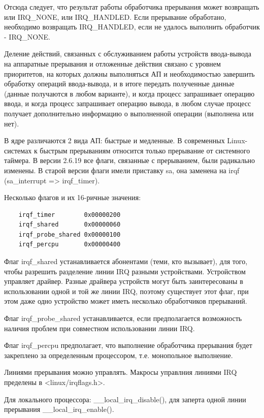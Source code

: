 \documentclass[12pt,a4paper]{scrreprt}
\begin{document}
Отсюда следует, что результат работы обработчика прерывания может возвращать или IRQ\_NONE, или IRQ\_HANDLED. Если прерывание обработано, необходимо возвращать IRQ\_HANDLED, если не удалось выполнить обработчик - IRQ\_NONE.

Деление действий, связанных с обслуживанием работы устройств ввода-вывода на аппаратные прерывания и отложенные действия связано с уровнем приоритетов, на которых должны выполняться
АП и необходимостью завершить обработку операций ввода-вывода, и в итоге передать полученные
данные (данные получаются в любом варианте), и когда процесс запрашивает операцию ввода, и когда
процесс запрашивает операцию вывода, в любом случае процесс получает дополнительно информацию о выполненной операции (выполнена или нет).

В ядре различаются 2 вида АП: быстрые и медленные. В современных Linux-системах к быстрым прерываниям относится только прерывание от системного таймера. В версии 2.6.19 все флаги, связанные с прерыванием, были радикально изменены. В старой версии флаги имели приставку sa, она заменена на irqf (sa\_interrupt => irqf\_timer).

Несколько флагов и их 16-ричные значения:

\begin{lstlisting}
	irqf_timer        0x00000200
	irqf_shared       0x00000060
	irqf_probe_shared 0x00000100
	irqf_percpu       0x00000400
\end{lstlisting}

Флаг irqf\_shared устанавливается абонентами (теми, кто вызывает), для того, чтобы разрешить разделение линии IRQ разными устройствами. Устройством управляет драйвер. Разные драйвера устройств могут быть заинтересованы в использовании одной и той же линии IRQ, поэтому существует этот флаг, при этом даже одно устройство может иметь несколько обработчиков прерываний.

Флаг irqf\_probe\_shared устанавливается, если предполагается возможность наличия проблем при совместном использовании линии IRQ.

Флаг irqf\_percpu предполагает, что выполнение обработчика прерывания будет закреплено за определенным процессором, т.е. монопольное выполнение.

Линиями прерывания можно управлять. Макросы управлния линиями IRQ пределены в <linux/irqflags.h>.

Для локального процессора: \_\_local\_irq\_disable(), для заперта одной линии прерывания \_\_local\_irq\_enable().
\end{document}
